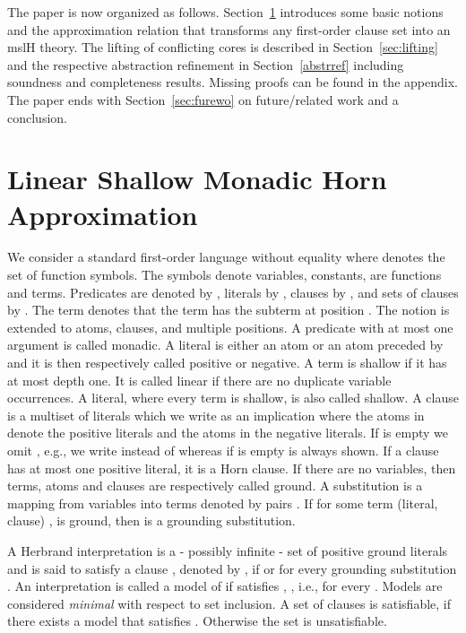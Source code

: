 \documentclass{llncs}
\begin{document}
The paper is now organized as follows. Section~\ref{sec:abstr} introduces some basic notions and the approximation relation 
that transforms any first-order clause set into an mslH theory.
The lifting of conflicting cores is described in Section~\ref{sec:lifting} and the respective abstraction refinement
in Section~\ref{abstrref} including soundness and completeness results. Missing proofs can be found in the appendix.
The paper ends with Section~\ref{sec:furewo} on future/related work and a conclusion.

  
\section{Linear Shallow Monadic Horn Approximation} \label{sec:abstr}

We consider a standard first-order language without equality where  
denotes the set of function symbols.
The symbols  denote variables,  constants, 
 are functions and  terms. 
Predicates are denoted by , literals by , clauses by , and sets of clauses by  .
The term  denotes that the term  has the subterm  at position . 
The notion is extended to atoms, clauses, and multiple positions.
A predicate with at most one argument is called monadic.
A literal is either an atom or an atom preceded by  and it is then respectively  called positive or negative.
A term is shallow if it has at most depth one. 
It is called linear if there are no duplicate variable occurrences. 
A literal, where every term is shallow, is also called shallow. 
A clause is a multiset of literals which we write as an implication  where the atoms in  denote the positive literals
and the atoms in  the negative literals.
If  is empty we omit , e.g., we write  instead of  whereas if
 is empty  is always shown.
If a clause has at most one positive literal, it is a Horn clause.
If there are no variables, then terms, atoms and clauses are respectively called ground.
A substitution  is a mapping from variables into terms denoted by pairs .
If for some term (literal, clause) ,  is ground, then  is a grounding substitution.


A Herbrand interpretation  is a - possibly infinite - set of positive ground literals and  is said to satisfy a 
clause , denoted by , if   or  for every grounding substitution .
An interpretation  is called a model of  if  satisfies , , i.e., 
 for every . Models are considered \emph{minimal} with respect to set inclusion.
A set of clauses  is satisfiable, if there exists a model that satisfies . Otherwise the set is unsatisfiable.
\end{document}
